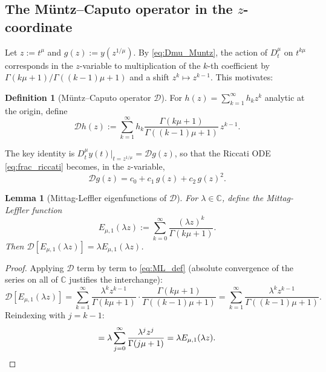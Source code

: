 \documentclass[12pt,a4paper]{amsart}
\newcommand{\assign}{:=}
\newcommand{\ML}[2]{E_{#1,#2}}
\theoremstyle{plain}
\newtheorem{lemma}[theorem]{Lemma}
\theoremstyle{definition}
\newtheorem{definition}[theorem]{Definition}
\theoremstyle{remark}
\begin{document}
\subsection{The M\"untz--Caputo operator in the $z$-coordinate}

Let $z\assign t^{\mu}$ and $g(z)\assign y(z^{1/\mu})$. By
\eqref{eq:Dmu_Muntz}, the action of $D^{\mu}_t$ on $t^{k\mu}$ corresponds
in the $z$-variable to multiplication of the $k$-th coefficient by
$\Gamma(k\mu+1)/\Gamma((k-1)\mu+1)$ and a shift $z^k\mapsto z^{k-1}$.
This motivates:

\begin{definition}[M\"untz--Caputo operator $\mathcal{D}$]\label{def:cD}
For $h(z)=\sum_{k=1}^{\infty}h_k z^k$ analytic at the origin, define
\begin{equation}\label{eq:cD_def}
  \mathcal{D}h(z)
  \assign\sum_{k=1}^{\infty}h_k\frac{\Gamma(k\mu+1)}{\Gamma((k-1)\mu+1)}\,z^{k-1}.
\end{equation}
\end{definition}

The key identity is $D^{\mu}_t y(t)\big|_{t=z^{1/\mu}}=\mathcal{D}g(z)$,
so that the Riccati ODE \eqref{eq:frac_riccati} becomes, in the $z$-variable,
\begin{equation}\label{eq:riccati_z}
  \mathcal{D}g(z) = c_0 + c_1\,g(z) + c_2\,g(z)^2.
\end{equation}

\begin{lemma}[Mittag-Leffler eigenfunctions of $\mathcal{D}$]\label{lem:ML_eigen}
For $\lambda\in\mathbb{C}$, define the Mittag-Leffler function
\begin{equation}\label{eq:ML_def}
  \ML{\mu}{1}(\lambda z)\assign\sum_{k=0}^{\infty}\frac{(\lambda z)^k}{\Gamma(k\mu+1)}.
\end{equation}
Then $\mathcal{D}[\ML{\mu}{1}(\lambda z)]=\lambda\ML{\mu}{1}(\lambda z)$.
\end{lemma}

\begin{proof}
Applying $\mathcal{D}$ term by term to \eqref{eq:ML_def} (absolute convergence
of the series on all of $\mathbb{C}$ justifies the interchange):
\[
  \mathcal{D}[\ML{\mu}{1}(\lambda z)]
  =\sum_{k=1}^{\infty}\frac{\lambda^k z^{k-1}}{\Gamma(k\mu+1)}
   \cdot\frac{\Gamma(k\mu+1)}{\Gamma((k-1)\mu+1)}
  =\sum_{k=1}^{\infty}\frac{\lambda^k z^{k-1}}{\Gamma((k-1)\mu+1)}.
\]
Reindexing with $j=k-1$:
\[
  =\lambda\sum_{j=0}^{\infty}\frac{\lambda^j z^j}{\Gamma(j\mu+1)}
  =\lambda\ML{\mu}{1}(\lambda z).\qedhere
\]
\end{proof}
\end{document}
